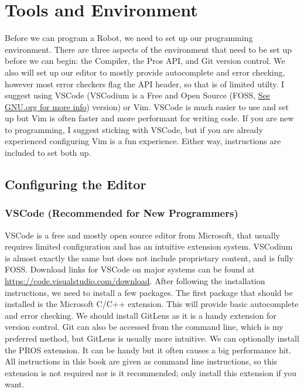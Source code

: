 \documentclass[main.tex]{subfiles}
\begin{document}
\chapter{Tools and Environment}

Before we can program a Robot, we need to set up our programming environment.
There are three aspects of the environment that need to be set up before we can begin: the Compiler, the Pros API, and Git version control.
We also will set up our editor to mostly provide autocomplete and error checking,
    however most error checkers flag the API header, so that is of limited utilty.
I suggest using VSCode (VSCodium is a Free and Open Source (FOSS, \href{https://www.gnu.org/philosophy/free-sw.html}{See GNU.org for more info}) version) or Vim.
VSCode is much easier to use and set up but Vim is often faster and more performant for writing code.
If you are new to programming, I suggest sticking with VSCode, but if you are already experienced configuring Vim is a fun experience.
Either way, instructions are included to set both up.

\section{Configuring the Editor}
\subsection {VSCode (Recommended for New Programmers)}

VSCode is a free and mostly open source editor from Microsoft,
    that usually requires limited configuration and has an intuitive extension system.
VSCodium is almost exactly the same but does not include proprietary content, and is fully FOSS.
Download links for VSCode on major systems can be found at \url{https://code.visualstudio.com/download}.
After following the installation instructions, we need to install a few packages.
The first package that should be installed is the Microsoft C/C++ extension.
This will provide basic autocomplete and error checking.
We should install GitLens as it is a handy extension for version control.
Git can also be accessed from the command line, which is my preferred method, but GitLens is usually more intuitive.
We can optionally install the PROS extension. 
It can be handy but it often causes a big performance hit.
All instructions in this book are given as command line instructions, so this extension is not required nor is it recommended;
    only install this extension if you want.
\end{document}
